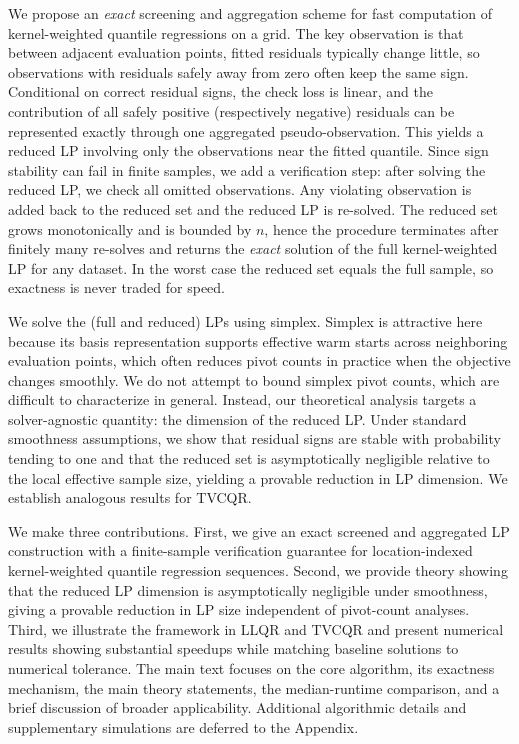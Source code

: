 \documentclass[lineno]{biometrika}
\begin{document}
We propose an \emph{exact} screening and aggregation scheme for fast computation of kernel-weighted quantile
regressions on a grid. The key observation is that between adjacent evaluation points, fitted residuals typically
change little, so observations with residuals safely away from zero often keep the same sign. Conditional on correct
residual signs, the check loss is linear, and the contribution of all safely positive (respectively negative) residuals
can be represented exactly through one aggregated pseudo-observation. This yields a reduced LP involving only the
observations near the fitted quantile. Since sign stability can fail in finite samples, we add a verification step:
after solving the reduced LP, we check all omitted observations. Any violating observation is added back to the reduced
set and the reduced LP is re-solved. The reduced set grows monotonically and is bounded by $n$, hence the procedure
terminates after finitely many re-solves and returns the \emph{exact} solution of the full kernel-weighted LP for any
dataset. In the worst case the reduced set equals the full sample, so exactness is never traded for speed.

We solve the (full and reduced) LPs using simplex. Simplex is attractive here because its basis representation supports
effective warm starts across neighboring evaluation points, which often reduces pivot counts in practice when the
objective changes smoothly. We do not attempt to bound simplex pivot counts, which are difficult to characterize in
general. Instead, our theoretical analysis targets a solver-agnostic quantity: the dimension of the reduced LP.
Under standard smoothness assumptions, we show that residual signs are stable with probability tending to one and that
the reduced set is asymptotically negligible relative to the local effective sample size, yielding a provable reduction
in LP dimension. We establish analogous results for TVCQR.

We make three contributions. First, we give an exact screened and aggregated LP construction with a finite-sample
verification guarantee for location-indexed kernel-weighted quantile regression sequences. Second, we provide theory
showing that the reduced LP dimension is asymptotically negligible under smoothness, giving a provable reduction in LP
size independent of pivot-count analyses. Third, we illustrate the framework in LLQR and TVCQR and present numerical
results showing substantial speedups while matching baseline solutions to numerical tolerance. The main text focuses on
the core algorithm, its exactness mechanism, the main theory statements, the median-runtime comparison, and a brief
discussion of broader applicability. Additional algorithmic details and supplementary simulations are deferred to the
Appendix.
\end{document}
